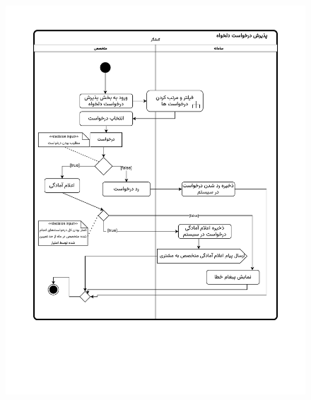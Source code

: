 \begin{figure}[ht!]
	\centering
	\includegraphics[scale=0.8]{figs/OOD-activity-arbitraryreq.pdf}
\end{figure}
\FloatBarrier
\newpage

